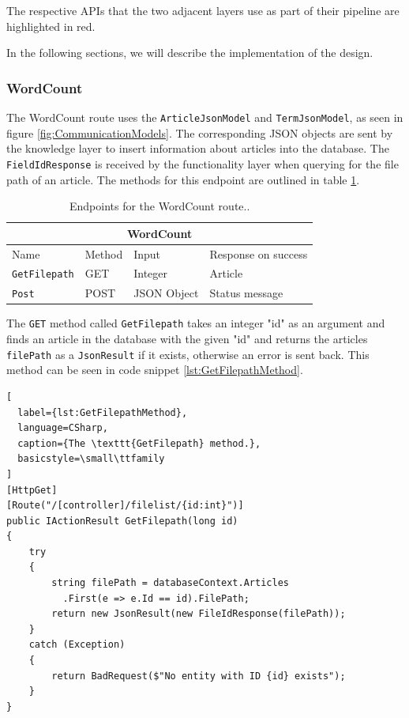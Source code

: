 The respective APIs that the two adjacent layers use as part of their pipeline are highlighted in red. 

In the following sections, we will describe the implementation of the design.

\subsubsection{WordCount}

The WordCount route uses the \texttt{ArticleJsonModel} and \texttt{TermJsonModel}, as seen in figure \ref{fig:CommunicationModels}. The corresponding JSON objects are sent by the knowledge layer to insert information about articles into the database. The \texttt{FieldIdResponse} is received by the functionality layer when querying for the file path of an article. The methods for this endpoint are outlined in table \ref{fig:WordCountEndpoint}.

\begin{table}[h]
  \centering
    \begin{tabular}{|llll|}
    \hline
    \multicolumn{4}{|c|}{\textbf{WordCount}}                                                                                 \\ \hline
    \multicolumn{1}{|l|}{Name}                 & \multicolumn{1}{l|}{Method} & \multicolumn{1}{l|}{Input}       & Response on success       \\ \hline
    \multicolumn{1}{|l|}{\texttt{GetFilepath}} & \multicolumn{1}{l|}{GET}    & \multicolumn{1}{l|}{Integer}     & Article        \\ \hline
    \multicolumn{1}{|l|}{\texttt{Post}}        & \multicolumn{1}{l|}{POST}   & \multicolumn{1}{l|}{JSON Object} & Status message \\ \hline
    \end{tabular}
  \caption{Endpoints for the WordCount route.\label{fig:WordCountEndpoint}.}
\end{table}

The \texttt{GET} method called \texttt{GetFilepath} takes an integer "id" as an argument and finds an article in the database with the given "id" and returns the articles \texttt{filePath} as a \texttt{JsonResult} if it exists, otherwise an error is sent back.
This method can be seen in code snippet \ref{lst:GetFilepathMethod}.

\begin{lstlisting}[
  label={lst:GetFilepathMethod},
  language=CSharp, 
  caption={The \texttt{GetFilepath} method.}, 
  basicstyle=\small\ttfamily
]
[HttpGet]
[Route("/[controller]/filelist/{id:int}")]
public IActionResult GetFilepath(long id)
{
    try
    {
        string filePath = databaseContext.Articles
          .First(e => e.Id == id).FilePath;
        return new JsonResult(new FileIdResponse(filePath));
    }
    catch (Exception)
    {
        return BadRequest($"No entity with ID {id} exists");
    }
}
\end{lstlisting}

